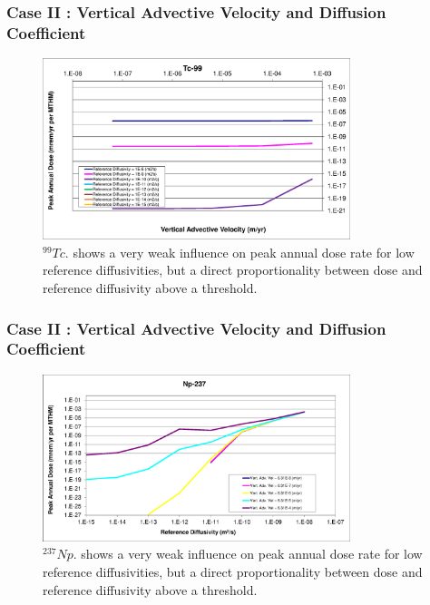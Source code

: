 \begin{frame}[c]
  \frametitle{Case II : Vertical Advective Velocity and Diffusion Coefficient}
\begin{figure}[ht!]
\centering
\includegraphics[width=0.8\textwidth]{AdvVelAndDiffCoeffEBSFail/Tc-99-VAdvVel.eps}
\caption{$^{99}Tc$.
shows a very weak influence on peak annual dose 
rate for low reference diffusivities, but a direct proportionality between 
dose and reference diffusivity above a threshold.}
\label{fig:VAdvVelTc99VAdvVel}
\end{figure}
\end{frame}


\begin{frame}[c]
  \frametitle{Case II : Vertical Advective Velocity and Diffusion Coefficient}
\begin{figure}[htp!]
\centering
\includegraphics[width=0.8\textwidth]{AdvVelAndDiffCoeffEBSFail/Np-237.eps}
\caption{$^{237}Np$.
shows a very weak influence on peak annual dose 
rate for low reference diffusivities, but a direct proportionality between 
dose and reference diffusivity above a threshold.}
\label{fig:VAdvVelNp237}
\end{figure}
\end{frame}

